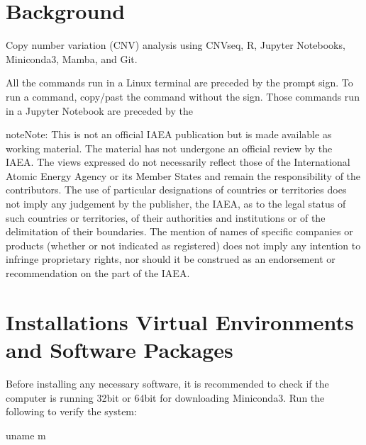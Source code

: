 \documentclass[letterpaper,10pt,english]{sphinxhowto}
\begin{document}
\pagestyle{plain}
\sphinxtableofcontents
\pagestyle{normal}
\label{\detokenize{index::doc}}



\section{Background}
\label{\detokenize{index:background}}
\sphinxAtStartPar
Copy number variation (CNV) analysis using CNVseq, R, Jupyter Notebooks, Miniconda3, Mamba, and Git.

\sphinxAtStartPar
All the commands run in a Linux terminal are preceded by the \sphinxtitleref{\$} prompt sign. To run a command, copy/past the command without the \sphinxtitleref{\$} sign. Those commands run in a Jupyter Notebook are preceded by the 

\begin{sphinxadmonition}{note}{Note:}
\sphinxAtStartPar
This is not an official IAEA publication but is made available as working material. The material has not undergone an official review by the IAEA. The views expressed do not necessarily reflect those of the International Atomic Energy Agency or its Member States and remain the responsibility of the contributors. The use of particular designations of countries or territories does not imply any judgement by the publisher, the IAEA, as to the legal status of such countries or territories, of their authorities and institutions or of the delimitation of their boundaries. The mention of names of specific companies or products (whether or not indicated as registered) does not imply any intention to infringe proprietary rights, nor should it be construed as an endorsement or recommendation on the part of the IAEA.
\end{sphinxadmonition}


\section{Installations \sphinxhyphen{} Virtual Environments and Software Packages}
\label{\detokenize{index:installations-virtual-environments-and-software-packages}}
\sphinxAtStartPar
Before installing any necessary software, it is recommended to check if the computer is running 32\sphinxhyphen{}bit or 64\sphinxhyphen{}bit for downloading Miniconda3. Run the following to verify the system:

\begin{sphinxVerbatim}[commandchars=\\\{\}]
\PYGZdl{} uname \PYGZhy{}m
\end{sphinxVerbatim}
\end{document}
